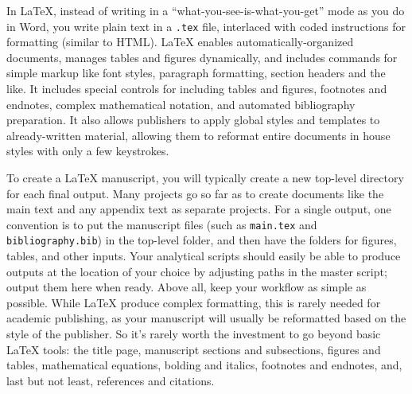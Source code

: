 In {\LaTeX}, instead of writing in a
``what-you-see-is-what-you-get'' mode as you do in Word,
you write plain text in a \texttt{.tex} file,
interlaced with coded instructions for formatting (similar to HTML).
{\LaTeX} enables automatically-organized documents,
manages tables and figures dynamically,
and includes commands for simple markup
like font styles, paragraph formatting, section headers and the like.
It includes special controls for including tables and figures,
footnotes and endnotes, complex mathematical notation, and automated bibliography preparation.
It also allows publishers to apply global styles and templates to already-written material,
allowing them to reformat entire documents in house styles with only a few keystrokes.

To create a {\LaTeX} manuscript,
you will typically create a new top-level directory for each final output.
Many projects go so far as to create documents like the main text
and any appendix text as separate projects.
For a single output, one convention is to put the manuscript files
(such as \texttt{main.tex} and \texttt{bibliography.bib})
in the top-level folder,
and then have the folders for figures, tables, and other inputs.
Your analytical scripts should easily be able to produce outputs
at the location of your choice by adjusting paths in the master script;
output them here when ready.
Above all, keep your workflow as simple as possible.
While {\LaTeX}  produce complex formatting,
this is rarely needed for academic publishing,
as your manuscript will usually be reformatted
based on the style of the publisher.
So it's rarely worth the investment to go beyond basic {\LaTeX} tools:
the title page, manuscript sections and subsections,
figures and tables, mathematical equations,
bolding and italics, footnotes and endnotes,
and, last but not least, references and citations.

